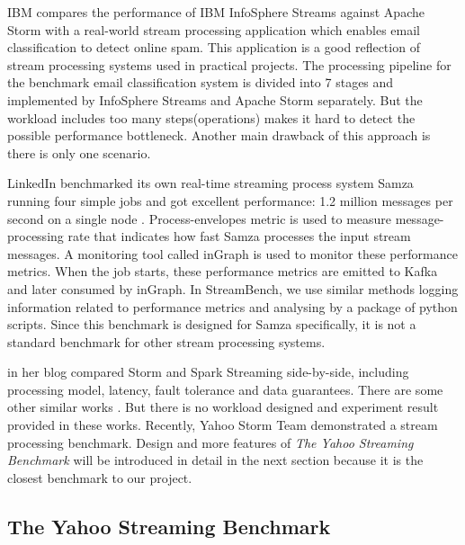 IBM compares the performance of IBM InfoSphere Streams against Apache Storm with a real-world stream processing application which enables email classification to detect online spam\cite{ibm2014streams}. This application is a good reflection of stream processing systems used in practical projects. The processing pipeline for the benchmark email classification system is divided into 7 stages and implemented by InfoSphere Streams and Apache Storm separately. But the workload includes too many steps(operations) makes it hard to detect the possible performance bottleneck. Another main drawback of this approach is there is only one scenario. 


LinkedIn benchmarked its own real-time streaming process system Samza running four simple jobs and got excellent performance: 1.2 million messages per second on a single node \cite{samza-benchmark}. Process-envelopes metric is used to measure message-processing rate that indicates how fast Samza processes the input stream messages. A monitoring tool called inGraph is used to monitor these performance metrics. When the job starts, these performance metrics are emitted to Kafka and later consumed by inGraph. In StreamBench, we use similar methods logging information related to performance metrics and analysing by a package of python scripts. Since this benchmark is designed for Samza specifically, it is not a standard benchmark for other stream processing systems.


\citet{xinhstechblog} in her blog compared Storm and Spark Streaming side-by-side, including processing model, latency, fault tolerance and data guarantees. There are some other similar works \cite{manoj-sotrm-vs-spark, manoj-realtime}. But there is no workload designed and experiment result provided in these works. Recently, Yahoo Storm Team demonstrated a stream processing benchmark. Design and more features of \textit{The Yahoo Streaming Benchmark} will be introduced in detail in the next section because it is the closest benchmark to our project.

\subsection{The Yahoo Streaming Benchmark}
\label{subsection:ysb}


